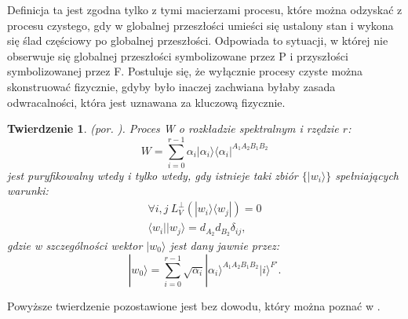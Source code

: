 \documentclass[10pt]{article} %
\newtheorem{tw}{Twierdzenie}
\DeclareMathOperator{\Trs}{Tr}
\newcommand{\Ket}[1]{|#1\rangle}
\newcommand{\Bra}[1]{\langle#1|}
\newcommand{\BBra}[1]{\langle\langle#1|}
\newcommand{\KKet}[1]{|#1\rangle\rangle}
\newcommand{\I}{\mathbb{1}}
\newcommand{\LPV}{{L^\perp_V}}
\begin{document}
Definicja ta jest zgodna tylko z tymi macierzami procesu, które można odzyskać z procesu czystego, gdy w globalnej przeszłości umieści się ustalony stan i wykona się ślad częściowy po globalnej przeszłości. Odpowiada to sytuacji, w której nie obserwuje się globalnej przeszłości symbolizowane przez P i przyszłości symbolizowanej przez F.
Postuluje się, że wyłącznie procesy czyste można skonstruować fizycznie, gdyby było inaczej zachwiana byłaby zasada odwracalności, która jest uznawana za kluczową fizycznie. 
\begin{tw}
(por. \cite{purification}).
Proces W o rozkładzie spektralnym i rzędzie $r$:
\begin{equation}
W = \sum_{i=0}^{r-1} \alpha_i \Ket{\alpha_i}\Bra{\alpha_i}^{A_1A_2B_1B_2}
\end{equation}
jest puryfikowalny wtedy i tylko wtedy, gdy istnieje taki zbiór $\{\Ket{w_i}\}$ spełniających warunki:
\begin{gather}
\forall i,j~\LPV(\Ket{w_i}\Bra{w_j}) = 0\\
\Bra{w_i}\Ket{w_j} = d_{A_2}d_{B_2}\delta_{ij},
\end{gather}
gdzie w szczególności wektor $\Ket{w_0}$ jest dany jawnie przez:
\begin{equation}
\label{w0}
\Ket{w_0} = \sum_{i=0}^{r-1} \sqrt{\alpha_i} \Ket{\alpha_i}^{A_1A_2B_1B_2}\Ket{i}^{F'}.
\end{equation}
\end{tw} Powyższe twierdzenie pozostawione jest bez dowodu, który można poznać w \cite{purification}. %
\end{document}
